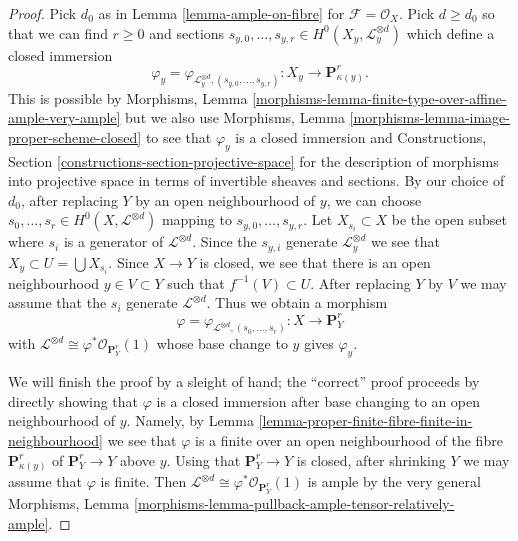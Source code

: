 \documentclass{stacks-project}
\theoremstyle{plain}
\theoremstyle{definition}
\theoremstyle{remark}
\numberwithin{equation}{subsection}
\begin{document}
\begin{proof}
Pick $d_0$ as in Lemma \ref{lemma-ample-on-fibre} for
$\mathcal{F} = \mathcal{O}_X$. Pick $d \geq d_0$
so that we can find $r \geq 0$ and sections
$s_{y, 0}, \ldots, s_{y, r} \in H^0(X_y, \mathcal{L}_y^{\otimes d})$
which define a closed immersion
$$
\varphi_y =
\varphi_{\mathcal{L}_y^{\otimes d}, (s_{y, 0}, \ldots, s_{y, r})} :
X_y \to \mathbf{P}^r_{\kappa(y)}.
$$
This is possible by Morphisms, Lemma
\ref{morphisms-lemma-finite-type-over-affine-ample-very-ample}
but we also use
Morphisms, Lemma \ref{morphisms-lemma-image-proper-scheme-closed}
to see that $\varphi_y$ is a closed immersion and
Constructions, Section \ref{constructions-section-projective-space}
for the description of morphisms into projective
space in terms of invertible sheaves and sections.
By our choice of $d_0$, after replacing $Y$ by an open neighbourhood
of $y$, we can choose
$s_0, \ldots, s_r \in H^0(X, \mathcal{L}^{\otimes d})$
mapping to $s_{y, 0}, \ldots, s_{y, r}$.
Let $X_{s_i} \subset X$ be the open subset where $s_i$
is a generator of $\mathcal{L}^{\otimes d}$. Since
the $s_{y, i}$ generate $\mathcal{L}_y^{\otimes d}$ we see that
$X_y \subset U = \bigcup X_{s_i}$.
Since $X \to Y$ is closed, we see that
there is an open neighbourhood $y \in V \subset Y$
such that $f^{-1}(V) \subset U$.
After replacing $Y$ by $V$ we may assume that
the $s_i$ generate $\mathcal{L}^{\otimes d}$. Thus we
obtain a morphism
$$
\varphi = \varphi_{\mathcal{L}^{\otimes d}, (s_0, \ldots, s_r)} :
X \longrightarrow \mathbf{P}^r_Y
$$
with $\mathcal{L}^{\otimes d} \cong \varphi^*\mathcal{O}_{\mathbf{P}^r_Y}(1)$
whose base change to $y$ gives $\varphi_y$.

\medskip\noindent
We will finish the proof by a sleight of hand; the ``correct'' proof
proceeds by directly showing that $\varphi$ is a closed
immersion after base changing to an open neighbourhood of $y$.
Namely, by Lemma \ref{lemma-proper-finite-fibre-finite-in-neighbourhood}
we see that $\varphi$ is a finite over an open neighbourhood
of the fibre $\mathbf{P}^r_{\kappa(y)}$ of $\mathbf{P}^r_Y \to Y$
above $y$. Using that $\mathbf{P}^r_Y \to Y$ is closed, after
shrinking $Y$ we may assume that $\varphi$ is finite.
Then $\mathcal{L}^{\otimes d} \cong \varphi^*\mathcal{O}_{\mathbf{P}^r_Y}(1)$
is ample by the very general
Morphisms, Lemma \ref{morphisms-lemma-pullback-ample-tensor-relatively-ample}.
\end{proof}
\end{document}
